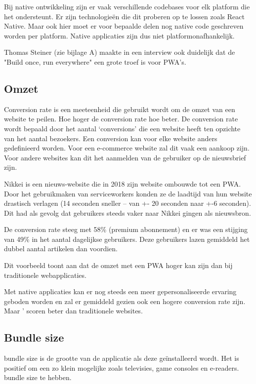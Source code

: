 	Bij native ontwikkeling zijn er vaak verschillende codebases voor elk platform die het ondersteunt. Er zijn technologieën die dit proberen op te lossen zoals React Native. Maar ook hier moet er voor bepaalde delen nog native code geschreven worden per platform. Native applicaties zijn dus niet platformonafhankelijk. 
	
	Thomas Steiner (zie bijlage A) maakte in een interview ook duidelijk dat de "Build once, run everywhere" een grote troef is voor PWA's.

\subsection{Omzet}
	Conversion rate is een meeteenheid die gebruikt wordt om de omzet van een website te peilen. Hoe hoger de conversion rate hoe beter. De conversion rate wordt bepaald door het aantal ‘conversions’ die een website heeft ten opzichte van het aantal bezoekers. Een conversion kan voor elke website anders gedefinieerd worden. Voor een e-commerce website zal dit vaak een aankoop zijn. Voor andere websites kan dit het aanmelden van de gebruiker op de nieuwsbrief zijn.
	\autocite{GoogleSupport2020}
	
	Nikkei is een nieuws-website die in 2018 zijn website ombouwde tot een PWA.  Door het gebruikmaken van serviceworkers konden ze de laadtijd van hun website drastisch verlagen (14 seconden sneller – van +- 20 seconden naar +-6 seconden). Dit had als gevolg dat gebruikers steeds vaker naar Nikkei gingen als nieuwsbron. 
	
	De conversion rate steeg met 58\% (premium abonnement) en er was een stijging van 49\% in het aantal dagelijkse gebruikers. Deze gebruikers lazen gemiddeld het dubbel aantal artikelen dan voordien. 
	\autocite{Developers2018}
	
	Dit voorbeeld toont aan dat de omzet met een PWA hoger kan zijn dan bij traditionele webapplicaties.
	
	Met native applicaties kan er nog steeds een meer gepersonaliseerde ervaring geboden worden en zal er gemiddeld gezien ook een hogere conversion rate zijn. Maar ' scoren beter dan traditionele websites.
	\autocite{Anastasia2019}
	

\subsection{Bundle size}

	bundle size is de grootte van de applicatie als deze geïnstalleerd wordt. Het is positief om een zo klein mogelijke zoals televisies, game consoles en e-readers.  bundle size te hebben.
	\autocite{Scott2019}
	
